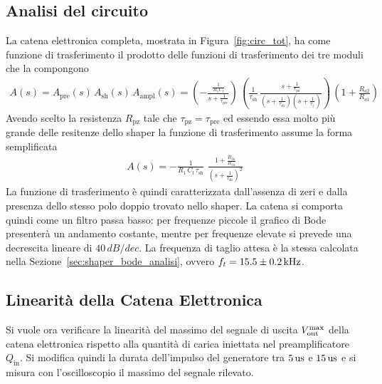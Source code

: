 \subsection{Analisi del circuito }\label{sec:catena_analisi}
La catena elettronica completa, mostrata in Figura~\ref{fig:circ_tot}, ha come funzione di
trasferimento il prodotto delle funzioni di trasferimento dei tre moduli che
la compongono
\begin{align}
  A(s)= A_{\text{pre}}(s) \, A_{\text{sh}}(s) \, A_{\text{ampl}}(s) = \left(-
  \frac{\frac{1}{R_{1}C_{\text{f}}}}{s+\frac{1}{\tau_{\text{pre}}}}\right) \, \left(\frac{1}{\tau_{\text{sh}}}\,\frac{s+\frac{1}{\tau_{\text{pz}}}}{(s+\frac{1}{\tau_{\text{sh}}})(s+\frac{1}{\tau_{\parallel}})}\right) \,\left(1+\frac{R_{a2}}{R_{a1}}\right)
\end{align}
Avendo scelto la resistenza $R_{\text{pz}}$ tale che $\tau_{\text{pz}} = \tau_{\text{pre}}$ ed essendo essa molto più grande delle resitenze dello shaper la funzione di trasferimento assume la forma semplificata
\begin{align}
  A(s)=- \frac{1}{R_{1}\,C_{\text{f}}\, \tau_{\text{sh}}} \,\,
  \frac{1+\frac{R_{2a}}{R_{1a}}}{\left(s+\frac{1}{\tau_{\text{sh}}}\right)^{2}}
\end{align}
La funzione di trasferimento è quindi caratterizzata dall'assenza di zeri e
dalla presenza dello stesso polo doppio trovato nello shaper. La catena si comporta
quindi come un filtro passa basso: per frequenze piccole il grafico di Bode presenterà un andamento costante, mentre per frequenze elevate si prevede
una decrescita lineare di $40\,dB/dec$. La frequenza di taglio attesa è la
stessa calcolata nella Sezione~\ref{sec:shaper_bode_analisi}, ovvero $f_{t}= 15.5\pm 0.2\kHz$.

\subsection{Linearità della Catena Elettronica}\label{sec:catena_lin}
Si vuole ora verificare la linearità del massimo del segnale di uscita $V_{\text{out}}^{\text{max}}$ della catena elettronica rispetto alla quantità di carica iniettata nel preamplificatore $Q_{\text{in}}$. Si modifica quindi la
durata dell'impulso del generatore tra $5\us$ e $15\us$ e si misura con
l'oscilloscopio il massimo del segnale rilevato.

